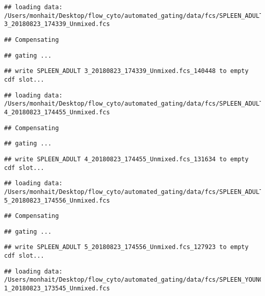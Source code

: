 \documentclass[]{book}
\begin{document}
\begin{verbatim}
## loading data: /Users/monhait/Desktop/flow_cyto/automated_gating/data/fcs/SPLEEN_ADULT 3_20180823_174339_Unmixed.fcs
\end{verbatim}

\begin{verbatim}
## Compensating
\end{verbatim}

\begin{verbatim}
## gating ...
\end{verbatim}

\begin{verbatim}
## write SPLEEN_ADULT 3_20180823_174339_Unmixed.fcs_140448 to empty cdf slot...
\end{verbatim}

\begin{verbatim}
## loading data: /Users/monhait/Desktop/flow_cyto/automated_gating/data/fcs/SPLEEN_ADULT 4_20180823_174455_Unmixed.fcs
\end{verbatim}

\begin{verbatim}
## Compensating
\end{verbatim}

\begin{verbatim}
## gating ...
\end{verbatim}

\begin{verbatim}
## write SPLEEN_ADULT 4_20180823_174455_Unmixed.fcs_131634 to empty cdf slot...
\end{verbatim}

\begin{verbatim}
## loading data: /Users/monhait/Desktop/flow_cyto/automated_gating/data/fcs/SPLEEN_ADULT 5_20180823_174556_Unmixed.fcs
\end{verbatim}

\begin{verbatim}
## Compensating
\end{verbatim}

\begin{verbatim}
## gating ...
\end{verbatim}

\begin{verbatim}
## write SPLEEN_ADULT 5_20180823_174556_Unmixed.fcs_127923 to empty cdf slot...
\end{verbatim}

\begin{verbatim}
## loading data: /Users/monhait/Desktop/flow_cyto/automated_gating/data/fcs/SPLEEN_YOUNG 1_20180823_173545_Unmixed.fcs
\end{verbatim}
\end{document}
